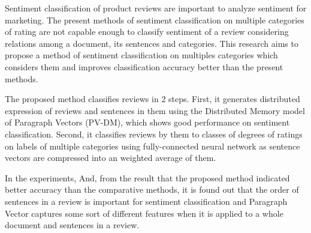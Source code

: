 Sentiment classification of product reviews are important
to analyze sentiment for marketing.
The present methods of sentiment classification
on multiple categories of rating
are not capable enough to classify sentiment of a review
considering relations among a document, its sentences and categories.
This research aims to propose a method of sentiment classification
on multiples categories
which considers them and improves classification accuracy better
than the present methods.

The proposed method classifies reviews in 2 steps.
First, it generates distributed expression of reviews and sentences in them
using the Distributed  Memory model of Paragraph Vectors (PV-DM),
which shows good performance on sentiment classification.
Second, it classifies reviews by them to classes of degrees of ratings
on labels of multiple categories using fully-connected neural network
as sentence vectors are compressed into an weighted average of them.

In the experiments,
And, from the result that the proposed method indicated better accuracy
than the comparative methods, it is found out that
the order of sentences in a review is important for sentiment classification
and Paragraph Vector captures some sort of different features
when it is applied to a whole document and sentences in a review.
